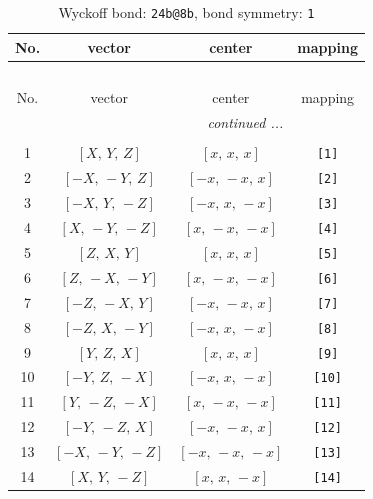 \documentclass[fleqn,8pt]{jsarticle}
\begin{document}
\begin{longtable}{cccc}
\caption{Wyckoff bond: {\tt 24b@8b}, bond symmetry: {\tt 1}}
 \\
 \hline \hline
No. & vector & center & mapping \\ \hline \endfirsthead

\multicolumn{3}{l}{\tablename\ \thetable{}} \\
 \hline \hline
No. & vector & center & mapping \\ \hline \endhead

 \hline \hline
\multicolumn{3}{r}{\footnotesize\it continued ...} \\ \endfoot

 \hline \hline
\multicolumn{3}{r}{} \\ \endlastfoot

1 & $\left[ X,\, Y,\, Z \right]$ & $\left[ x,\, x,\, x \right]$ & {\tt [1]} \\ \hline
2 & $\left[ - X,\, - Y,\, Z \right]$ & $\left[ - x,\, - x,\, x \right]$ & {\tt [2]} \\ \hline
3 & $\left[ - X,\, Y,\, - Z \right]$ & $\left[ - x,\, x,\, - x \right]$ & {\tt [3]} \\ \hline
4 & $\left[ X,\, - Y,\, - Z \right]$ & $\left[ x,\, - x,\, - x \right]$ & {\tt [4]} \\ \hline
5 & $\left[ Z,\, X,\, Y \right]$ & $\left[ x,\, x,\, x \right]$ & {\tt [5]} \\ \hline
6 & $\left[ Z,\, - X,\, - Y \right]$ & $\left[ x,\, - x,\, - x \right]$ & {\tt [6]} \\ \hline
7 & $\left[ - Z,\, - X,\, Y \right]$ & $\left[ - x,\, - x,\, x \right]$ & {\tt [7]} \\ \hline
8 & $\left[ - Z,\, X,\, - Y \right]$ & $\left[ - x,\, x,\, - x \right]$ & {\tt [8]} \\ \hline
9 & $\left[ Y,\, Z,\, X \right]$ & $\left[ x,\, x,\, x \right]$ & {\tt [9]} \\ \hline
10 & $\left[ - Y,\, Z,\, - X \right]$ & $\left[ - x,\, x,\, - x \right]$ & {\tt [10]} \\ \hline
11 & $\left[ Y,\, - Z,\, - X \right]$ & $\left[ x,\, - x,\, - x \right]$ & {\tt [11]} \\ \hline
12 & $\left[ - Y,\, - Z,\, X \right]$ & $\left[ - x,\, - x,\, x \right]$ & {\tt [12]} \\ \hline
13 & $\left[ - X,\, - Y,\, - Z \right]$ & $\left[ - x,\, - x,\, - x \right]$ & {\tt [13]} \\ \hline
14 & $\left[ X,\, Y,\, - Z \right]$ & $\left[ x,\, x,\, - x \right]$ & {\tt [14]} \\ \hline

\end{longtable}
\end{document}
